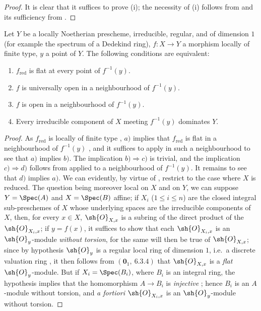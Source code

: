 \begin{proof}
It is clear that it suffices to prove (i); the necessity of (i) follows from  and its sufficiency from .
\end{proof}

\begin{proposition}[14.3.8]
\label{IV.14.3.8}
Let $Y$ be a locally Noetherian prescheme, irreducible, regular, and of dimension $1$ (for example the spectrum of a Dedekind ring), $f:X\to Y$ a morphism locally of finite type, $y$ a point of $Y$.
The following conditions are equivalent:
\begin{enumerate}[label=\emph{\alph*)}]
  \item $f_{\mathrm{red}}$ is flat at every point of $f^{-1}(y)$.
  \item $f$ is universally open in a neighbourhood of $f^{-1}(y)$.
  \item $f$ is open in a neighbourhood of $f^{-1}(y)$.
  \item Every irreducible component of $X$ meeting $f^{-1}(y)$ dominates $Y$.
\end{enumerate}
\end{proposition}

\begin{proof}
As $f_{\mathrm{red}}$ is locally of finite type , $a)$ implies that $f_{\mathrm{red}}$ is flat in a neighbourhood of $f^{-1}(y)$ , and it suffices to apply  in such a neighbourhood to see that $a)$ implies $b)$.
The implication $b)\Rightarrow c)$ is trivial, and the implication $c)\Rightarrow d)$ follows from  applied to a neighbourhood of $f^{-1}(y)$.
It remains to see that $d)$ implies $a)$.
We can evidently, by virtue of , restrict to the case where $X$ is reduced.
The question being moreover local on $X$ and on $Y$, we can suppose $Y=\Spec(A)$ and $X=\Spec(B)$
affine; if $X_i$ ($1\leq i\leq n$) are the closed integral sub-preschemes of $X$ whose underlying spaces are the irreducible components of $X$, then, for every $x\in X$, $\sh{O}_{X,x}$ is a subring of the direct product of the $\sh{O}_{X_i,x}$; if $y=f(x)$, it suffices to show that each $\sh{O}_{X_i,x}$ is an $\sh{O}_y$-module \emph{without torsion}, for the same will then be true of $\sh{O}_{X,x}$; since by hypothesis $\sh{O}_y$ is a regular local ring of dimension $1$, i.e.\ a discrete valuation ring , it then follows from $(\mathbf{0}_1,~6.3.4)$ that $\sh{O}_{X,x}$ is a \emph{flat} $\sh{O}_y$-module.
But if $X_i=\Spec(B_i)$, where $B_i$ is an integral ring, the hypothesis implies that the homomorphism $A\to B_i$ is \emph{injective} ; hence $B_i$ is an $A$-module without torsion, and \emph{a fortiori} $\sh{O}_{X_i,x}$ is an $\sh{O}_y$-module without torsion.
\end{proof}

